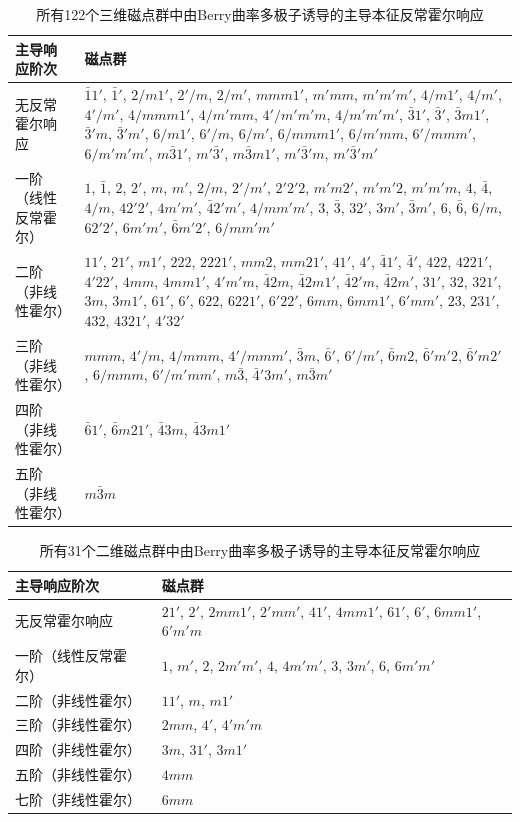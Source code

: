 \begin{table}[H]
\centering
\caption{所有122个三维磁点群中由Berry曲率多极子诱导的主导本征反常霍尔响应}
\label{tab:3d}
\begin{tabular}{p{3.5cm} p{10cm}}
\toprule
\textbf{主导响应阶次} & \textbf{磁点群} \\
\midrule
无反常霍尔响应 & 
$\bar{1}1'$, $\bar{1}'$, $2/m1'$, $2'/m$, $2/m'$, $mmm1'$, $m'mm$, $m'm'm'$, $4/m1'$, $4/m'$, $4'/m'$, $4/mmm1'$, $4/m'mm$, $4'/m'm'm$, $4/m'm'm'$, $\bar{3}1'$, $\bar{3}'$, $\bar{3}m1'$, $\bar{3}'m$, $\bar{3}'m'$, $6/m1'$, $6'/m$, $6/m'$, $6/mmm1'$, $6/m'mm$, $6'/mmm'$, $6/m'm'm'$, $m\bar{3}1'$, $m'\bar{3}'$, $m\bar{3}m1'$, $m'\bar{3}'m$, $m'\bar{3}'m'$ \\
\midrule
一阶（线性反常霍尔） & 
$1$, $\bar{1}$, $2$, $2'$, $m$, $m'$, $2/m$, $2'/m'$, $2'2'2$, $m'm2'$, $m'm'2$, $m'm'm$, $4$, $\bar{4}$, $4/m$, $42'2'$, $4m'm'$, $\bar{4}2'm'$, $4/mm'm'$, $3$, $\bar{3}$, $32'$, $3m'$, $\bar{3}m'$, $6$, $\bar{6}$, $6/m$, $62'2'$, $6m'm'$, $\bar{6}m'2'$, $6/mm'm'$ \\
\midrule
二阶（非线性霍尔） & 
$11'$, $21'$, $m1'$, $222$, $2221'$, $mm2$, $mm21'$, $41'$, $4'$, $\bar{4}1'$, $\bar{4}'$, $422$, $4221'$, $4'22'$, $4mm$, $4mm1'$, $4'm'm$, $\bar{4}2m$, $\bar{4}2m1'$, $\bar{4}2'm$, $\bar{4}2m'$, $31'$, $32$, $321'$, $3m$, $3m1'$, $61'$, $6'$, $622$, $6221'$, $6'22'$, $6mm$, $6mm1'$, $6'mm'$, $23$, $231'$, $432$, $4321'$, $4'32'$ \\
\midrule
三阶（非线性霍尔） & 
$mmm$, $4'/m$, $4/mmm$, $4'/mmm'$, $\bar{3}m$, $\bar{6}'$, $6'/m'$, $\bar{6}m2$, $\bar{6}'m'2$, $\bar{6}'m2'$, $6/mmm$, $6'/m'mm'$, $m\bar{3}$, $\bar{4}'3m'$, $m\bar{3}m'$ \\
\midrule
四阶（非线性霍尔） & 
$\bar{6}1'$, $\bar{6}m21'$, $\bar{4}3m$, $\bar{4}3m1'$ \\
\midrule
五阶（非线性霍尔） & 
$m\bar{3}m$ \\
\bottomrule
\end{tabular}
\end{table}

\begin{table}[H]
\centering
\caption{所有31个二维磁点群中由Berry曲率多极子诱导的主导本征反常霍尔响应}
\label{tab:2d}
\begin{tabular}{p{3.5cm} p{8cm}}
\toprule
\textbf{主导响应阶次} & \textbf{磁点群} \\
\midrule
无反常霍尔响应 & 
$21'$, $2'$, $2mm1'$, $2'mm'$, $41'$, $4mm1'$, $61'$, $6'$, $6mm1'$, $6'm'm$ \\
\midrule
一阶（线性反常霍尔） & 
$1$, $m'$, $2$, $2m'm'$, $4$, $4m'm'$, $3$, $3m'$, $6$, $6m'm'$ \\
\midrule
二阶（非线性霍尔） & 
$11'$, $m$, $m1'$ \\
\midrule
三阶（非线性霍尔） & 
$2mm$, $4'$, $4'm'm$ \\
\midrule
四阶（非线性霍尔） & 
$3m$, $31'$, $3m1'$ \\
\midrule
五阶（非线性霍尔） & 
$4mm$ \\
\midrule
七阶（非线性霍尔） & 
$6mm$ \\
\bottomrule
\end{tabular}
\end{table}

